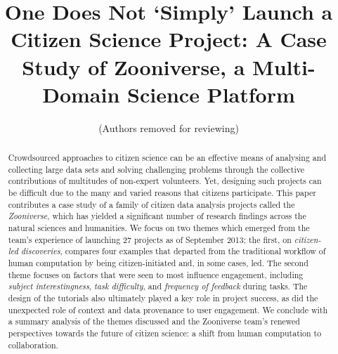 \documentclass{sigchi}
\begin{document}
\title{One Does Not `Simply' Launch a Citizen Science Project: A Case Study of Zooniverse, a Multi-Domain Science Platform}

 \author{ (Authors removed for reviewing) }
% 
% 
% 


\maketitle

\begin{abstract}
Crowdsourced approaches to citizen science can be an effective means of analysing and collecting large data sets and solving challenging problems through the collective contributions of multitudes of non-expert volunteers. Yet, designing such projects can be difficult due to the many and varied reasons that citizens participate. This paper contributes a case study of a family of citizen data analysis projects called the \emph{Zooniverse}, which has yielded a significant number of research findings across the natural sciences and humanities.  We focus on two themes which emerged from the team's experience of launching 27 projects as of September 2013; the first, on \emph{citizen-led discoveries}, compares four examples that departed from the traditional workflow of human computation by being citizen-initiated and, in some cases, led.  The second theme focuses on factors that were seen to most influence engagement, including \emph{subject interestingness}, \emph{task difficulty}, and \emph{frequency of feedback} during tasks.  The design of the tutorials also ultimately played a key role in project success, as did the unexpected role of context and data provenance to user engagement.  We conclude with a summary analysis of the themes discussed and the Zooniverse team's renewed perspectives towards the future of citizen science: a shift from human computation to collaboration.
\end{abstract}


\end{document}
